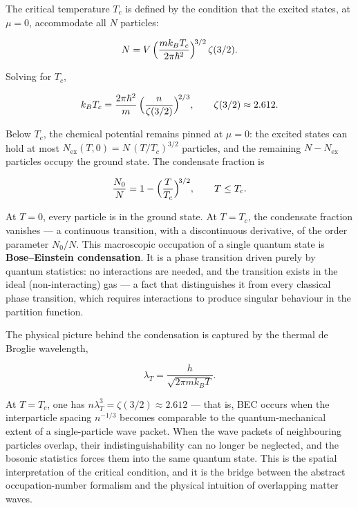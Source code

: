 The critical temperature $T_c$ is defined by the condition that the excited states, at $\mu = 0$, accommodate all $N$ particles:
\begin{linenomath}
    \begin{equation}
        N = V\,\Bigl(\frac{m k_B T_c}{2\pi\hbar^2}\Bigr)^{\!3/2}\,\zeta(3/2).
    \end{equation}
\end{linenomath}
Solving for $T_c$,
\begin{linenomath}
    \begin{equation}
        k_B T_c
        = \frac{2\pi\hbar^2}{m}\,
          \Bigl(\frac{n}{\zeta(3/2)}\Bigr)^{\!2/3},
        \qquad
        \zeta(3/2) \approx 2.612.
        \label{eq:tc-bec}
    \end{equation}
\end{linenomath}
Below $T_c$, the chemical potential remains pinned at $\mu = 0$: the excited states can hold at most $N_{\text{ex}}(T, 0) = N\,(T/T_c)^{3/2}$ particles, and the remaining $N - N_{\text{ex}}$ particles occupy the ground state. The condensate fraction is
\begin{linenomath}
    \begin{equation}
        \frac{N_0}{N} = 1 - \Bigl(\frac{T}{T_c}\Bigr)^{\!3/2},
        \qquad T \leq T_c.
        \label{eq:condensate-fraction}
    \end{equation}
\end{linenomath}
At $T = 0$, every particle is in the ground state. At $T = T_c$, the condensate fraction vanishes --- a continuous transition, with a discontinuous derivative, of the order parameter $N_0/N$. This macroscopic occupation of a single quantum state is \textbf{Bose--Einstein condensation}. It is a phase transition driven purely by quantum statistics: no interactions are needed, and the transition exists in the ideal (non-interacting) gas --- a fact that distinguishes it from every classical phase transition, which requires interactions to produce singular behaviour in the partition function.

The physical picture behind the condensation is captured by the thermal de Broglie wavelength,
\begin{linenomath}
    \begin{equation*}
        \lambda_T = \frac{h}{\sqrt{2\pi m k_B T}}.
    \end{equation*}
\end{linenomath}
At $T = T_c$, one has $n\lambda_T^3 = \zeta(3/2) \approx 2.612$ --- that is, BEC occurs when the interparticle spacing $n^{-1/3}$ becomes comparable to the quantum-mechanical extent of a single-particle wave packet. When the wave packets of neighbouring particles overlap, their indistinguishability can no longer be neglected, and the bosonic statistics forces them into the same quantum state. This is the spatial interpretation of the critical condition, and it is the bridge between the abstract occupation-number formalism and the physical intuition of overlapping matter waves.

